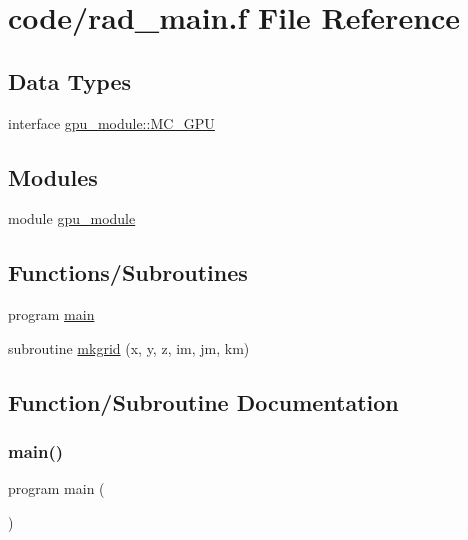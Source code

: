 \hypertarget{rad__main_8f}{}\section{code/rad\+\_\+main.f File Reference}
\label{rad__main_8f}
\subsection*{Data Types}
\begin{DoxyCompactItemize}
\item 
interface \hyperlink{interfacegpu__module_1_1MC__GPU}{gpu\+\_\+module\+::\+M\+C\+\_\+\+G\+PU}
\end{DoxyCompactItemize}
\subsection*{Modules}
\begin{DoxyCompactItemize}
\item 
module \hyperlink{namespacegpu__module}{gpu\+\_\+module}
\end{DoxyCompactItemize}
\subsection*{Functions/\+Subroutines}
\begin{DoxyCompactItemize}
\item 
program \hyperlink{rad__main_8f_a8ec2266d83cd6c0b762cbcbc92c0af3d}{main}
\item 
subroutine \hyperlink{rad__main_8f_a257f7cef7cb961317e0772d235bd8af1}{mkgrid} (x, y, z, im, jm, km)
\end{DoxyCompactItemize}


\subsection{Function/\+Subroutine Documentation}
\mbox{\label{rad__main_8f_a8ec2266d83cd6c0b762cbcbc92c0af3d}} 
\subsubsection{\texorpdfstring{main()}{main()}}
{\footnotesize\ttfamily program main (\begin{DoxyParamCaption}{ }\end{DoxyParamCaption})}

